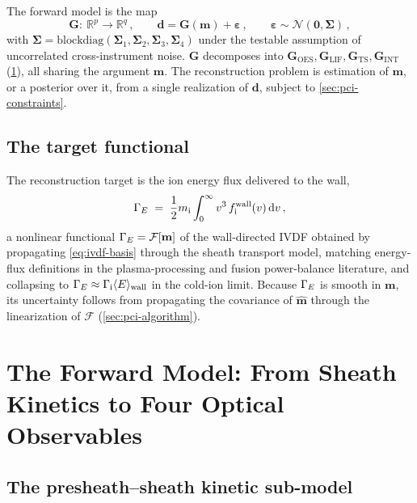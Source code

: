The forward model is the map
\begin{equation}
\mathbf{G}:\ \mathbb{R}^{p}\longrightarrow\mathbb{R}^{q}\, ,\qquad \mathbf{d} = \mathbf{G}(\mathbf{m}) + \boldsymbol{\varepsilon}\, ,\qquad \boldsymbol{\varepsilon}\sim\mathcal N(\mathbf 0,\boldsymbol{\Sigma})\, , \label{ch15-eq:forward-general}
\end{equation}
with $\boldsymbol{\Sigma}=\mathrm{blockdiag}(\boldsymbol{\Sigma}_{1},\boldsymbol{\Sigma}_{2},\boldsymbol{\Sigma}_{3},\boldsymbol{\Sigma}_{4})$ under the testable assumption of uncorrelated cross-instrument noise. $\mathbf{G}$ decomposes into $\mathbf{G}_{\mathrm{OES}},\mathbf{G}_{\mathrm{LIF}},\mathbf{G}_{\mathrm{TS}},\mathbf{G}_{\mathrm{INT}}$ (\cref{sec:pci-forward}), all sharing the argument $\mathbf{m}$. The reconstruction problem is estimation of $\mathbf{m}$, or a posterior over it, from a single realization of $\mathbf{d}$, subject to \cref{sec:pci-constraints}.

\subsection{The target functional}

The reconstruction target is the ion energy flux delivered to the wall,
\begin{equation}
\Gamma_{E} \;=\; \frac{1}{2}m_{\mathrm i}\int_{0}^{\infty} v^{3}\, f_{\mathrm i}^{\mathrm{wall}}(v)\,\mathrm dv \, , \label{eq:gammaE-def}
\end{equation}
a nonlinear functional $\Gamma_{E}=\mathcal{F}[\mathbf{m}]$ of the wall-directed IVDF obtained by propagating \cref{eq:ivdf-basis} through the sheath transport model, matching energy-flux definitions in the plasma-processing \cite{ref0080,ref0074} and fusion power-balance \cite{ref0093} literature, and collapsing to $\Gamma_{E}\approx \Gamma_{\mathrm i}\langle E\rangle_{\mathrm{wall}}$ in the cold-ion limit. Because $\Gamma_{E}$ is smooth in $\mathbf{m}$, its uncertainty follows from propagating the covariance of $\hat{\mathbf{m}}$ through the linearization of $\mathcal{F}$ (\cref{sec:pci-algorithm}).

\section{The Forward Model: From Sheath Kinetics to Four Optical Observables}
\label{sec:pci-forward}

\subsection{The presheath--sheath kinetic sub-model}

